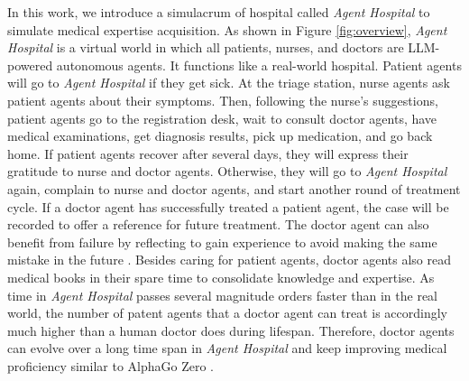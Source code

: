 \documentclass[fleqn,12pt]{wlscirep}
\begin{document}
In this work, we introduce a simulacrum of hospital called {\it Agent Hospital} to simulate medical expertise acquisition. 
As shown in Figure \ref{fig:overview}, {\it Agent Hospital} is a virtual world in which all patients, nurses, and doctors are LLM-powered autonomous agents. It functions like a real-world hospital. 
Patient agents will go to {\it Agent Hospital} if they get sick. At the triage station, nurse agents ask patient agents about their symptoms. Then, following the nurse's suggestions, patient agents go to the registration desk, wait to consult doctor agents, have medical examinations, get diagnosis results, pick up medication, and go back home. If patient agents recover after several days, they will express their gratitude to nurse and doctor agents. Otherwise, they will go to {\it Agent Hospital} again, complain to nurse and doctor agents, and start another round of treatment cycle. 
If a doctor agent has successfully treated a patient agent, the case will be recorded to offer a reference for future treatment. The doctor agent can also benefit from failure by reflecting to gain experience to avoid making the same mistake in the future \cite{Yang:23:Rule_Accumulation}. Besides caring for patient agents, doctor agents also read medical books in their spare time to consolidate knowledge and expertise. 
As time in {\it Agent Hospital} passes several magnitude orders faster than in the real world, the number of patent agents that a doctor agent can treat is accordingly much higher than a human doctor does during lifespan. Therefore, doctor agents can evolve over a long time span in {\it Agent Hospital} and keep improving medical proficiency similar to AlphaGo Zero \cite{Silver:17:AlphaGo-Zero}.
\end{document}
